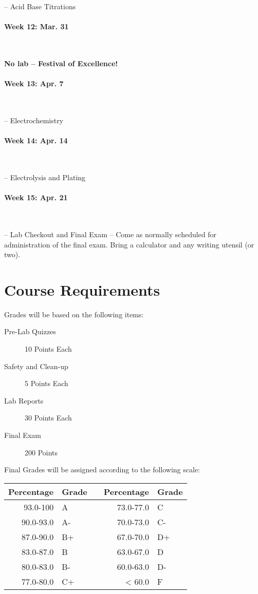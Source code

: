 \documentclass[12pt, letterpaper]{article}
\begin{document}
-- Acid Base Titrations

\paragraph{Week 12: Mar. 31}~

\textbf{No lab -- Festival of Excellence!}

\paragraph{Week 13: Apr. 7}~

-- Electrochemistry

\paragraph{Week 14: Apr. 14}~

-- Electrolysis and Plating

\paragraph{Week 15: Apr. 21}~

-- Lab Checkout and Final Exam -- Come as normally scheduled for administration of the final exam. Bring a calculator and any writing utensil (or two).


\section*{Course Requirements}
Grades will be based on the following items:
\begin{description}
	\item[Pre-Lab Quizzes] 10 Points Each
	\item[Safety and Clean-up] 5 Points Each
	\item[Lab Reports] 30 Points Each
	\item[Final Exam] 200 Points
\end{description}
Final Grades will be assigned according to the following scale:

\begin{tabular}{rl|c|rl}
	Percentage & Grade &  & Percentage & Grade \\ \midrule
	93.0-100   & A     &  & 73.0-77.0  & C     \\
	90.0-93.0  & A-    &  & 70.0-73.0  & C-    \\
	87.0-90.0  & B+    &  & 67.0-70.0  & D+    \\
	83.0-87.0  & B     &  & 63.0-67.0  & D     \\
	80.0-83.0  & B-    &  & 60.0-63.0  & D-    \\
	77.0-80.0  & C+    &  & < 60.0     & F
\end{tabular}
\end{document}
